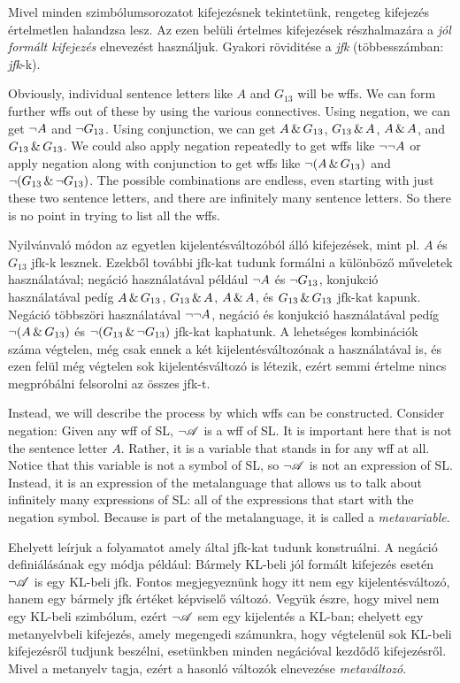 Mivel minden szimbólumsorozatot kifejezésnek tekintetünk, rengeteg kifejezés értelmetlen halandzsa lesz. Az ezen belüli értelmes kifejezések részhalmazára a \emph{jól formált kifejezés} elnevezést használjuk. Gyakori röviditése a \emph{jfk} (többesszámban: \emph{jfk}-k).

Obviously, individual sentence letters like $A$ and $G_{13}$ will be wffs. We can form further wffs out of these by using the various connectives. Using negation, we can get $\neg A$ and $\neg G_{13}$. Using conjunction, we can get $A \,\&\, G_{13}$, $G_{13} \,\&\, A$, $A \,\&\, A$, and $G_{13} \,\&\, G_{13}$. We could also apply negation repeatedly to get wffs like $\neg \neg A$ or apply negation along with conjunction to get wffs like $\neg(A \,\&\, G_{13})$ and $\neg(G_{13} \,\&\, \neg G_{13})$. The possible combinations are endless, even starting with just these two sentence letters, and there are infinitely many sentence letters. So there is no point in trying to list all the wffs.

Nyilvánvaló módon az egyetlen kijelentésváltozóból álló kifejezések, mint pl. $A$ és $G_{13}$ jfk-k lesznek. Ezekből további jfk-kat tudunk formálni a különböző műveletek használatával; negáció használatával például $\neg A$ és $\neg G_{13}$, konjukció használatával pedíg $A \,\&\, G_{13}$, $G_{13} \,\&\, A$, $A \,\&\, A$, és $G_{13} \,\&\, G_{13}$ jfk-kat kapunk. Negáció többszöri használatával $\neg \neg A$, negáció és konjukció használatával pedíg $\neg(A \,\&\, G_{13})$ és $\neg(G_{13} \,\&\, \neg G_{13})$ jfk-kat kaphatunk. A lehetséges kombinációk száma végtelen, még csak ennek a két kijelentésváltozónak a használatával is, és ezen felül még végtelen sok kijelentésváltozó is létezik, ezért semmi értelme nincs megpróbálni felsorolni az összes jfk-t.

Instead, we will describe the process by which wffs can be constructed. Consider negation: Given any wff  of SL, $\neg\mathscr{A}$ is a wff of SL. It is important here that  is not the sentence letter $A$. Rather, it is a variable that stands in for any wff at all. Notice that this variable  is not a symbol of SL, so $\neg\mathscr{A}$ is not an expression of SL. Instead, it is an expression of the metalanguage that allows us to talk about infinitely many expressions of SL: all of the expressions that start with the negation symbol. Because  is part of the metalanguage, it is called a \emph{metavariable}.

Ehelyett leírjuk a folyamatot amely által jfk-kat tudunk konstruálni. A negáció definiálásának egy módja például: Bármely KL-beli  jól formált kifejezés esetén $\neg\mathscr{A}$ is egy KL-beli jfk. Fontos megjegyeznünk hogy itt  nem egy kijelentésváltozó, hanem egy bármely jfk értéket képviselő változó. Vegyük észre, hogy mivel  nem egy KL-beli szimbólum, ezért $\neg\mathscr{A}$ sem egy kijelentés a KL-ban; ehelyett egy metanyelvbeli kifejezés, amely megengedi számunkra, hogy végtelenül sok KL-beli kifejezésről tudjunk beszélni, esetünkben minden negációval kezdődő kifejezésről. Mivel  a metanyelv tagja, ezért a hasonló változók elnevezése \emph{metaváltozó}.

